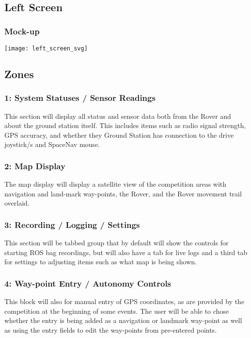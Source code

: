 \subsection{Left Screen}
\subsubsection{Mock-up}
\vspace{1em}
\begin{minipage}{\linewidth}
  \begin{center}
  \texttt{[image: left\_screen\_svg]}
  \end{center}
\end{minipage}

\subsection{Zones}
\subsubsection{1: System Statuses / Sensor Readings}
This section will display all status and sensor data both from the Rover and about the ground station itself.
This includes items such as radio signal strength, GPS accuracy, and whether they Ground Station has connection to the drive joystick/s and SpaceNav mouse.

\subsubsection{2: Map Display}
The map display will display a satellite view of the competition areas with navigation and land-mark way-points, the Rover, and the Rover movement trail overlaid.

\subsubsection{3: Recording / Logging / Settings}
This section will be tabbed group that by default will show the controls for starting ROS bag recordings, but will also have a tab for live logs and a third tab for settings to adjusting items such as what map is being shown.

\subsubsection{4: Way-point Entry / Autonomy Controls}
This block will also for manual entry of GPS coordinates, as are provided by the competition at the beginning of some events.
The user will be able to chose whether the entry is being added as a navigation or landmark way-point as well as using the entry fields to edit the way-points from pre-entered points.


